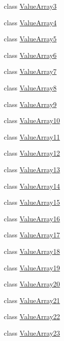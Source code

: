 \begin{DoxyCompactItemize}
\item 
class \hyperlink{classtesting_1_1internal_1_1ValueArray3}{\-Value\-Array3}
\item 
class \hyperlink{classtesting_1_1internal_1_1ValueArray4}{\-Value\-Array4}
\item 
class \hyperlink{classtesting_1_1internal_1_1ValueArray5}{\-Value\-Array5}
\item 
class \hyperlink{classtesting_1_1internal_1_1ValueArray6}{\-Value\-Array6}
\item 
class \hyperlink{classtesting_1_1internal_1_1ValueArray7}{\-Value\-Array7}
\item 
class \hyperlink{classtesting_1_1internal_1_1ValueArray8}{\-Value\-Array8}
\item 
class \hyperlink{classtesting_1_1internal_1_1ValueArray9}{\-Value\-Array9}
\item 
class \hyperlink{classtesting_1_1internal_1_1ValueArray10}{\-Value\-Array10}
\item 
class \hyperlink{classtesting_1_1internal_1_1ValueArray11}{\-Value\-Array11}
\item 
class \hyperlink{classtesting_1_1internal_1_1ValueArray12}{\-Value\-Array12}
\item 
class \hyperlink{classtesting_1_1internal_1_1ValueArray13}{\-Value\-Array13}
\item 
class \hyperlink{classtesting_1_1internal_1_1ValueArray14}{\-Value\-Array14}
\item 
class \hyperlink{classtesting_1_1internal_1_1ValueArray15}{\-Value\-Array15}
\item 
class \hyperlink{classtesting_1_1internal_1_1ValueArray16}{\-Value\-Array16}
\item 
class \hyperlink{classtesting_1_1internal_1_1ValueArray17}{\-Value\-Array17}
\item 
class \hyperlink{classtesting_1_1internal_1_1ValueArray18}{\-Value\-Array18}
\item 
class \hyperlink{classtesting_1_1internal_1_1ValueArray19}{\-Value\-Array19}
\item 
class \hyperlink{classtesting_1_1internal_1_1ValueArray20}{\-Value\-Array20}
\item 
class \hyperlink{classtesting_1_1internal_1_1ValueArray21}{\-Value\-Array21}
\item 
class \hyperlink{classtesting_1_1internal_1_1ValueArray22}{\-Value\-Array22}
\item 
class \hyperlink{classtesting_1_1internal_1_1ValueArray23}{\-Value\-Array23}
\item 

\end{DoxyCompactItemize}
